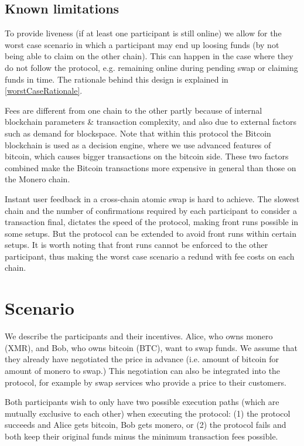 \documentclass{llncs}
\begin{document}
\subsection{Known limitations}
To provide liveness (if at least one participant is still online) we allow for the worst case scenario in which a participant may end up loosing funds (by not being able to claim on the other chain). This can happen in the case where they do not follow the protocol, e.g. remaining online during pending swap or claiming funds in time. The rationale behind this design is explained in \ref{worstCaseRationale}.

Fees are different from one chain to the other partly because of internal blockchain parameters \& transaction complexity, and also due to external factors such as demand for blockspace. Note that within this protocol the Bitcoin blockchain is used as a decision engine, where we use advanced features of bitcoin, which causes bigger transactions on the bitcoin side. These two factors combined make the Bitcoin transactions more expensive in general than those on the Monero chain.

Instant user feedback in a cross-chain atomic swap is hard to achieve.  The slowest chain and the number of confirmations required by each participant to consider a transaction final, dictates the speed of the protocol, making front runs possible in some setups. But the protocol can be extended to avoid front runs within certain setups. It is worth noting that front runs cannot be enforced to the other participant, thus making the worst case scenario a redund with fee costs on each chain.

\section{Scenario}
We describe the participants and their incentives. Alice, who owns monero (XMR), and Bob, who owns bitcoin (BTC), want to swap funds. We assume that they already have negotiated the price in advance (i.e. amount of bitcoin for amount of monero to swap.) This negotiation can also be integrated into the protocol, for example by swap services who provide a price to their customers.

Both participants wish to only have two possible execution paths (which are mutually exclusive to each other) when executing the protocol: (1) the protocol succeeds and Alice gets bitcoin, Bob gets monero, or (2) the protocol fails and both keep their original funds minus the minimum transaction fees possible.
\end{document}
